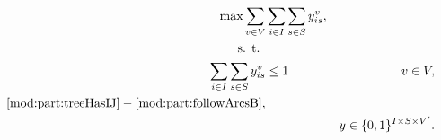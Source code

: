 \begin{subequations}\label{mod:genmatch}
\begin{align}
\notag \max\sum\limits_{v\in V}&\sum\limits_{i\in I}\sum\limits_{s\in S}   y_{is}^v,\\
\notag \text{s. t. } \\
\label{mod:genmatch:nodeBelongs} \sum\limits_{i\in I}\sum\limits_{s\in S}y^v_{is} & \leq 1 & v\in V,\\
\notag\eqref{mod:part:treeHasIJ} - \eqref{mod:part:followArcsB},\\
\label{mod:genmatch:dim}&&y \in \{0,1\}^{I\times S\times V'}.
\end{align}~
\end{subequations}




